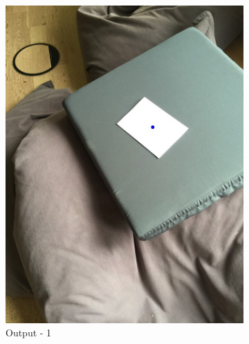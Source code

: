 \documentclass[paper=a4, fontsize=10pt]{scrartcl} %
\numberwithin{equation}{section} %
\numberwithin{figure}{section} %
\begin{document}
\begin{figure}[!ht]
	\centering
	\begin{subfigure}[b]{0.25\textwidth}
		\includegraphics[width=\textwidth]{output_01}
		\caption{Output - 1}
		\label{fig:output_01}
	\end{subfigure}
	~ 
	\begin{subfigure}[b]{0.25\textwidth}

\end{subfigure}
\end{figure}
\end{document}
